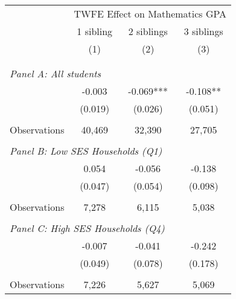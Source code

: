 \makeatletter
{}
{
\makeatother
\begin{tabular}{lccc}
\toprule
\cmidrule(lr){2-4}
& \multicolumn{3}{c}{TWFE Effect on Mathematics GPA} \\
\cmidrule(lr){2-4}
& 1 sibling & 2 siblings & 3 siblings  \\
\cmidrule(lr){2-2} \cmidrule(lr){3-3} \cmidrule(lr){4-4}
& (1) & (2) & (3)\\
\bottomrule
&  &  &  \\
&  &  &   \\
\multicolumn{4}{l}{\textit{Panel A: All students}} \\
\hspace{3mm}        &      -0.003   &      -0.069***&      -0.108** \\
                    &     (0.019)   &     (0.026)   &     (0.051)   \\
                    &               &               &               \\
\hspace{3mm}Observations&      40,469   &      32,390   &      27,705   \\
 
&  &  &   \\
\multicolumn{4}{l}{\textit{Panel B: Low SES Households (Q1)}} \\
\hspace{3mm}        &       0.054   &      -0.056   &      -0.138   \\
                    &     (0.047)   &     (0.054)   &     (0.098)   \\
                    &               &               &               \\
\hspace{3mm}Observations&       7,278   &       6,115   &       5,038   \\
 
&  &  &   \\
\multicolumn{4}{l}{\textit{Panel C: High SES Households (Q4)}} \\
\hspace{3mm}        &      -0.007   &      -0.041   &      -0.242   \\
                    &     (0.049)   &     (0.078)   &     (0.178)   \\
                    &               &               &               \\
\hspace{3mm}Observations&       7,226   &       5,627   &       5,069   \\
 

\end{tabular}}
